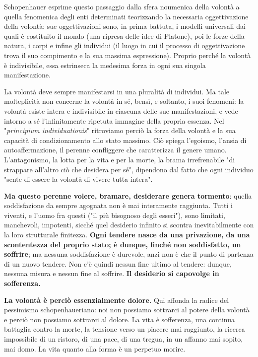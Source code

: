 Schopenhauer esprime questo passaggio dalla sfera noumenica della volontà a quella fenomenica degli enti determinati teorizzando la necessaria oggettivazione della volontà: sue oggettivazioni sono, in prima battuta, i modelli universali dai quali è costituito il mondo (una ripresa delle idee di Platone), poi le forze della natura, i corpi e infine gli individui (il luogo in cui il processo di oggettivazione trova il suo compimento e la sua massima espressione). Proprio perché la volontà è indivisibile, essa estrinseca la medesima forza in ogni sua singola manifestazione. 

La volontà deve sempre manifestarsi in una pluralità di individui. Ma tale molteplicità non concerne la volontà in sé, bensì, e soltanto, i suoi fenomeni: la volontà esiste intera e indivisibile in ciascuna delle sue manifestazioni, e vede intorno a sé l’infinitamente ripetuta immagine della propria essenza. Nel "\textit{principium individuationis}" ritroviamo perciò la forza della volontà e la sua capacità di condizionamento allo stato massimo. Ciò spiega l’egoismo, l’ansia di autoaffermazione, il perenne confliggere che caratterizza il genere umano. L’antagonismo, la lotta per la vita e per la morte, la brama irrefrenabile "di strappare all’altro ciò che desidera per sé", dipendono dal fatto che ogni individuo "sente di essere la volontà di vivere tutta intera". 

\textbf{Ma questo perenne volere, bramare, desiderare genera tormento}: quella soddisfazione da sempre agognata non è mai interamente raggiunta. Tutti i viventi, e l’uomo fra questi ("il più bisognoso degli esseri"), sono limitati, manchevoli, impotenti, sicché quel desiderio infinito si scontra inevitabilmente con la loro strutturale finitezza. \textbf{Ogni tendere nasce da una privazione, da una scontentezza del proprio stato; è dunque, finché non soddisfatto, un soffrire}; ma nessuna soddisfazione è durevole, anzi non è che il punto di partenza di un nuovo tendere. Non c’è quindi nessun fine ultimo al tendere: dunque, nessuna misura e nessun fine al soffrire. \textbf{Il desiderio si capovolge in sofferenza. }

\textbf{La volontà è perciò essenzialmente dolore.} Qui affonda la radice del pessimismo schopenhaueriano: noi non possiamo sottrarci al potere della volontà e perciò non possiamo sottrarci al dolore. La vita è sofferenza, una continua battaglia contro la morte, la tensione verso un piacere mai raggiunto, la ricerca impossibile di un ristoro, di una pace, di una tregua, in un affanno mai sopito, mai domo. La vita quanto alla forma è un perpetuo morire. 

